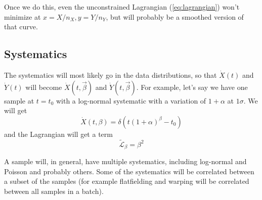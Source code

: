 \documentclass[11pt]{article}
\newcommand{\Xdot}{\dot{X}}
\newcommand{\Ydot}{\dot{Y}}
\begin{document}
Once we do this, even the unconstrained Lagrangian (\cref{eq:lagrangian}) won't minimize at \(x=X/n_X, y=Y/n_Y\), but will probably be a smoothed version of that curve.

\subsection{Systematics}
\label{sec:systematics}

The systematics will most likely go in the data distributions, so that \(\Xdot(t)\) and \(\Ydot(t)\) will become \(\Xdot(t,\vec{\beta})\) and \(\Ydot(t,\vec{\beta})\).  For example, let's say we have one sample at \(t=t_0\) with a log-normal systematic with a variation of \(1+\alpha\) at \(1\sigma\).  We will get
\begin{equation}
\Xdot(t,\beta)=\delta(t(1+\alpha)^\beta-t_0)
\end{equation}
and the Lagrangian will get a term
\begin{equation}
\mathcal{\tilde{L}_\beta}=\beta^2
\end{equation}

A sample will, in general, have multiple systematics, including log-normal and Poisson and probably others.  Some of the systematics will be correlated between a subset of the samples (for example flatfielding and warping will be correlated between all samples in a batch).

\printbibliography
\end{document}
